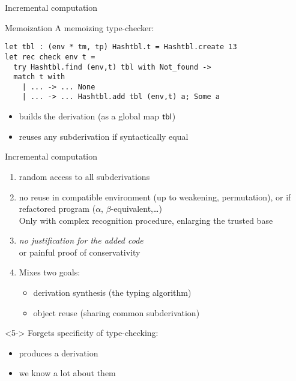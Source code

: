 \documentclass{beamer}
\theoremstyle{example}
\begin{document}
\begin{frame}[fragile]{Incremental computation}
  \begin{block}{Memoization}
    \vspace{0.5em}
    A \alert{memoizing} type-checker:

    \begin{lstlisting}
let tbl : (env * tm, tp) Hashtbl.t = Hashtbl.create 13
let rec check env t =
  try Hashtbl.find (env,t) tbl with Not_found ->
  match t with
    | ... -> ... None
    | ... -> ... Hashtbl.add tbl (env,t) a; Some a
    \end{lstlisting}

    \begin{itemize}
    \item builds the derivation (as a global map ${\rm\mathsf{tbl}}$)
    \item reuses any subderivation if syntactically equal
    \end{itemize}
  \end{block}
\end{frame}

\begin{frame}{Incremental computation}
  \begin{enumerate}[<+->]
  \item[\itplus] random access to all subderivations
  \item[\itminus] no reuse in compatible environment {\small (up to weakening,
    permutation)}, or if refactored program {\small ($\alpha$,
    $\beta$-equivalent,\ldots)} \\
    {\footnotesize Only with complex recognition procedure, enlarging
      the trusted base}
  \item[\itminus] {\large\it no justification for the added code} \\
    {\footnotesize or painful proof of conservativity}
  \item[\itminus] {\footnotesize Mixes two goals:}
    \begin{itemize}
    \item<4-> derivation synthesis {\footnotesize (the typing
      algorithm)}
    \item<4-> object reuse {\footnotesize (sharing common
      subderivation)}
    \end{itemize}

  \end{enumerate}

  \begin{visibleenv}<5->
    {\footnotesize Forgets specificity of type-checking:}
    \begin{itemize}
    \item {\large produces a derivation}
    \item {\large we know a lot about them}
    \end{itemize}
  \end{visibleenv}
\end{frame}
\end{document}

